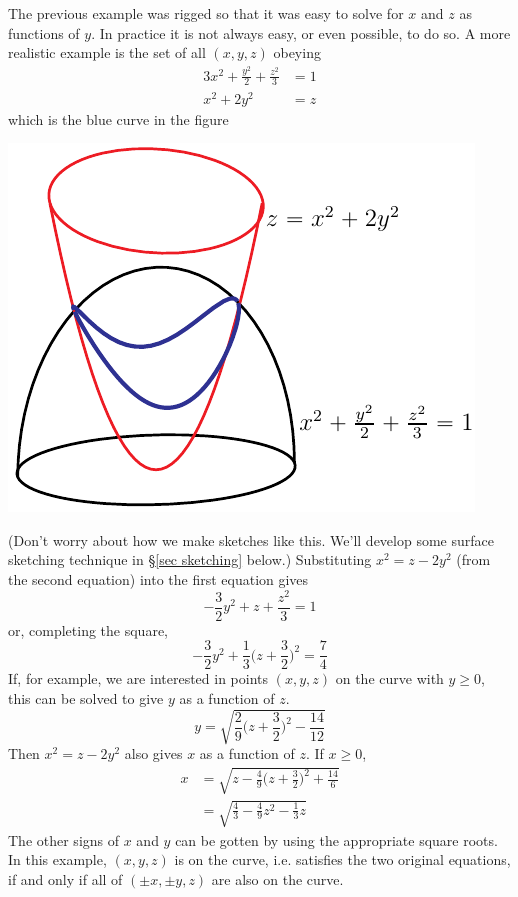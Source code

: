 \begin{eg}\label{eg:paramIntersectB}
The previous example was rigged so that it was easy to solve
for $x$ and $z$ as functions of $y$. In practice it is not always
easy, or even possible, to do so. A more realistic example is 
the set of all $(x,y,z)$ obeying
\begin{alignat*}{3}
 x^2+\frac{y^2}{2}+\frac{z^2}{3}&=1  \\
 x^2+2y^2&=z
\end{alignat*}
which is the blue curve in the figure 
\begin{nfig}
\begin{center}
    \includegraphics{stokes6.pdf}
\end{center}
\end{nfig}
(Don't worry about how we make sketches like this. We'll develop some
surface sketching technique in \S\ref{sec sketching} below.)
Substituting $x^2=z-2y^2$ (from the second equation)
into the first equation gives 
\begin{equation*}
-\frac{3}{2}y^2+z+\frac{z^2}{3}=1
\end{equation*}
or, completing the square,
\begin{equation*}
-\frac{3}{2}y^2 + \frac{1}{3}\Big(z+\frac{3}{2}\Big)^2 = \frac{7}{4}
\end{equation*}
If, for example, we are interested in points $(x,y,z)$ on the curve with 
$y\ge 0$, this can be solved to give $y$ as a function of $z$.
\begin{equation*}
y=\sqrt{\frac{2}{9}\Big(z+\frac{3}{2}\Big)^2-\frac{14}{12}}
\end{equation*}
Then $x^2=z-2y^2$ also gives $x$ as a function of $z$. If $x\ge 0$,
\begin{align*}
x&=\sqrt{z-\frac{4}{9}\Big(z+\frac{3}{2}\Big)^2+\frac{14}{6}} \\
&=\sqrt{\frac{4}{3}-\frac{4}{9}z^2-\frac{1}{3}z} 
\end{align*}
The other signs of $x$ and $y$ can be gotten by using the appropriate
square roots. In this example, $(x,y,z)$ is on the curve, i.e. satisfies
the two original equations, if and only if all of $(\pm x,\pm y, z)$ are also
on the curve.

\end{eg}



